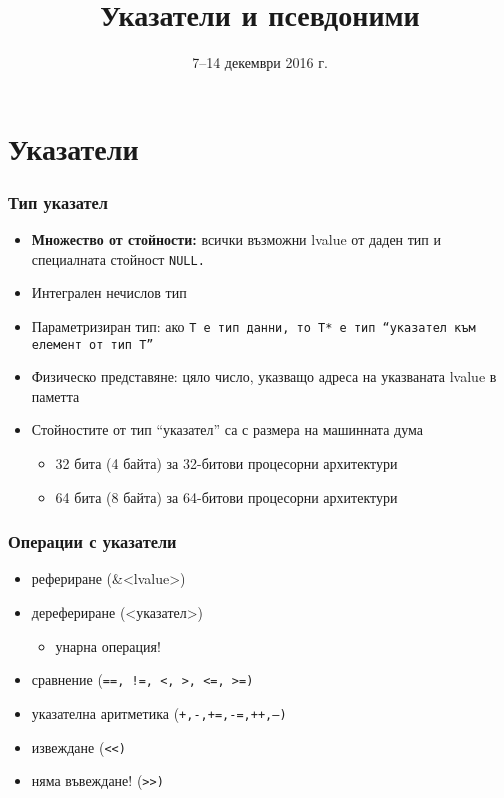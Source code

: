 \documentclass{beamer}
\title{Указатели и псевдоними}
\date{7--14 декември 2016 г.}
\begin{document}
\begin{frame}
  \titlepage
\end{frame}

\section{Указатели}

\begin{frame}
  \frametitle{Тип указател}

  \begin{itemize}
  \item \textbf{Множество от стойности:} всички възможни lvalue от даден тип и специалната стойност \tt{NULL}.
  \item Интегрален \alert{нечислов} тип
  \item Параметризиран тип: ако \tt T е тип данни, то \tt{T*} е тип ``указател към елемент от тип \tt T''
  \item Физическо представяне: цяло число, указващо адреса на указваната lvalue в паметта
  \item Стойностите от тип ``указател'' са с размера на машинната дума
    \begin{itemize}
    \item 32 бита (4 байта) за 32-битови процесорни архитектури
    \item 64 бита (8 байта) за 64-битови процесорни архитектури
    \end{itemize}
  \end{itemize}
\end{frame}

\begin{frame}
  \frametitle{Операции с указатели}

  \begin{itemize}
  \item рефериране (\tta\&<lvalue>)
  \item дерефериране (\tta*<указател>)
    \begin{itemize}
    \item \alert{унарна операция!}
    \end{itemize}
  \item сравнение (\tt{==}, \tt{!=}, \tt<, \tt>, \tt{<=}, \tt{>=})
  \item указателна аритметика (\tt+,\tt-,\tt{+=},\tt{-=},\tt{++},\tt{--})
  \item извеждане (\tt{<{}<})
  \item \alert{няма въвеждане! (\tt{>{}>})}
  \end{itemize}
\end{frame}
\end{document}
